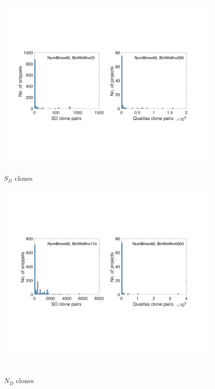 \documentclass[sigconf,review, anonymous]{acmart}
\begin{document}
\begin{figure}
		\centering
		\begin{minipage}{.4\textwidth}
			\centering
			\includegraphics[width=\linewidth]{hist_sd}
			\caption*{$S_D$ clones}
		\end{minipage}%
		\hspace{5ex}
		\begin{minipage}{0.4\textwidth}
			\centering
			\includegraphics[width=\linewidth]{hist_nd}
			\caption*{$N_D$ clones}
		\end{minipage}
		\\
		\begin{minipage}{.4\textwidth}
			\centering

\end{minipage}
\end{figure}
\end{document}
